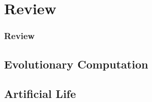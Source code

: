 \section{Review}

\frame
{
	\frametitle{Review}
}

\subsection{Evolutionary Computation}
\subsection{Artificial Life}